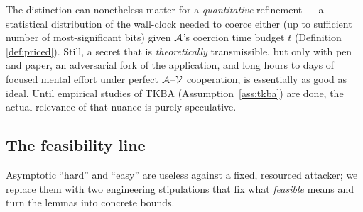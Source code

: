 \begin{remark}\label{rem:tacit-quantitative}
The distinction can nonetheless matter for a \emph{quantitative} refinement --- a
statistical distribution of the wall-clock needed to coerce either (up to sufficient
number of most-significant bits) given $\mathcal{A}$'s coercion time budget $t$ 
(Definition \ref{def:priced}). Still, a secret that is \emph{theoretically} transmissible, 
but only with pen and paper, an adversarial fork of the application, and long hours 
to days of focused mental effort under perfect $\mathcal{A}$--$\mathcal{V}$ cooperation, 
is essentially as good as ideal. Until empirical studies of TKBA (Assumption~\ref{ass:tkba}) 
are done, the actual relevance of that nuance is purely speculative.
\end{remark}

\subsection{The feasibility line}

Asymptotic ``hard'' and ``easy'' are useless against a fixed, resourced
attacker; we replace them with two engineering stipulations that fix what
\emph{feasible} means and turn the lemmas into concrete bounds.

